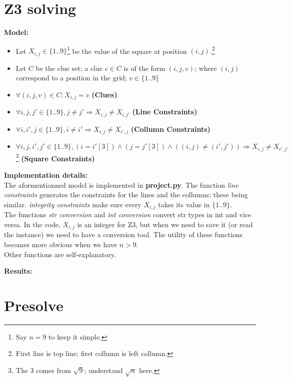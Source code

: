 \documentclass[12pt]{article}
\begin{document}
\section*{Z3 solving}

\textbf{Model:}\\

\begin{itemize}
    \item Let $X_{i,j} \in \{1..9\}$\footnote{Say $n=9$ to keep it simple.} be the value of the square at position $(i,j)$.\footnote{First line is top line; first collumn is left collumn.}
    \item Let $C$ be the clue set; a clue $c \in C$ is of the form $(i,j,v)$; where $(i,j)$ correspond to a position in the grid; $v \in \{1..9\}$
    \item $\forall (i,j,v) \in C: X_{i,j} = v$ \textbf{(Clues)}
    \item $\forall i, j, j' \in \{1..9\}, j \ne j' \Rightarrow X_{i,j} \ne X_{i,j'}$ \textbf{(Line Constraints)} 
    \item $\forall i, i', j \in \{1..9\}, i \ne i' \Rightarrow X_{i,j} \ne X_{i', j}$ \textbf{(Collumn Constraints)} 
    \item $\forall i,j,i',j' \in \{1..9\}, (i = i' [3]) \land (j = j' [3]) \land ( (i,j) \ne (i',j')) \Rightarrow X_{i,j} \ne X_{i', j'}$ \footnote{The 3 comes from $\sqrt 9$; understand $\sqrt n$ here.} \textbf{(Square Constraints)}
\end{itemize}

\textbf{Implementation details:}\\
The aformentionned model is implemented in \textbf{project.py}. The function \textit{line constraints} generates the constraints for the lines and the collumns; these being similar. \textit{integrity constraints} make sure every $X_{i,j}$ takes its value in $\{1..9\}$.\\
The functions \textit{str conversion} and \textit{int conversion} convert str types in int and vice versa. In the code, $X_{i,j}$ is an integer for Z3, but when we need to save it (or read the instance) we need to have a conversion tool. The utility of these functions becomes more obvious when we have $n > 9$. \\
Other functions are self-explanatory.

\textbf{Results:}\\



\section*{Presolve}
\end{document}
